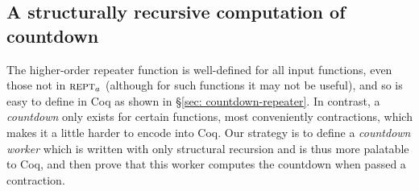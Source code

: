 
\subsection{A structurally recursive computation of countdown}

The higher-order repeater function is well-defined for all input functions, 
even those not in $\text{\scshape{rept}}_a$ (although for such functions it may not 
be useful), and so is easy to define
in Coq as shown in \S\ref{sec: countdown-repeater}. In contrast, a 
\emph{countdown} only exists for certain functions, most conveniently 
contractions, which makes it a little harder to encode into Coq. 
Our strategy is to define a \emph{countdown worker} which is written with only
structural recursion and is thus more palatable to Coq, and then 
prove that this worker computes the countdown when passed a contraction.

